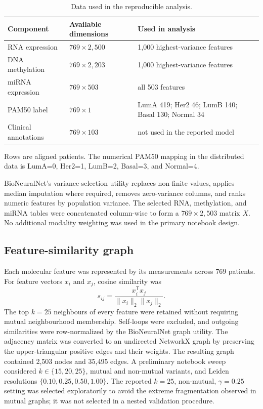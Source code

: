 \documentclass[11pt]{article}
\begin{document}
\begin{table}[t]
\centering
\caption{Data used in the reproducible analysis.}
\label{tab:data}
\begin{threeparttable}
\small
\begin{tabular}{p{}p{}p{}}
\toprule
Component & Available dimensions & Used in analysis \\
\midrule
RNA expression & $769\times2{,}500$ & 1,000 highest-variance features \\
DNA methylation & $769\times2{,}203$ & 1,000 highest-variance features \\
miRNA expression & $769\times503$ & all 503 features \\
PAM50 label & $769\times1$ & LumA 419; Her2 46; LumB 140; Basal 130; Normal 34 \\
Clinical annotations & $769\times103$ & not used in the reported model \\
\bottomrule
\end{tabular}
\begin{tablenotes}[flushleft]\footnotesize
\item Rows are aligned patients. The numerical PAM50 mapping in the distributed data is LumA=0, Her2=1, LumB=2, Basal=3, and Normal=4.
\end{tablenotes}
\end{threeparttable}
\end{table}

BioNeuralNet's variance-selection utility replaces non-finite values, applies median imputation where required, removes zero-variance columns, and ranks numeric features by population variance. The selected RNA, methylation, and miRNA tables were concatenated column-wise to form a $769\times2{,}503$ matrix $X$. No additional modality weighting was used in the primary notebook design.

\subsection{Feature-similarity graph}

Each molecular feature was represented by its measurements across 769 patients. For feature vectors $x_i$ and $x_j$, cosine similarity was
\begin{equation}
s_{ij}=\frac{x_i^{\mathsf T}x_j}{\lVert x_i\rVert_2\lVert x_j\rVert_2}.
\end{equation}
The top $k=25$ neighbours of every feature were retained without requiring mutual neighbourhood membership. Self-loops were excluded, and outgoing similarities were row-normalized by the BioNeuralNet graph utility. The adjacency matrix was converted to an undirected NetworkX graph by preserving the upper-triangular positive edges and their weights. The resulting graph contained 2,503 nodes and 35,495 edges. A preliminary notebook sweep considered $k\in\{15,20,25\}$, mutual and non-mutual variants, and Leiden resolutions $\{0.10,0.25,0.50,1.00\}$. The reported $k=25$, non-mutual, $\gamma=0.25$ setting was selected exploratorily to avoid the extreme fragmentation observed in mutual graphs; it was not selected in a nested validation procedure.
\end{document}
